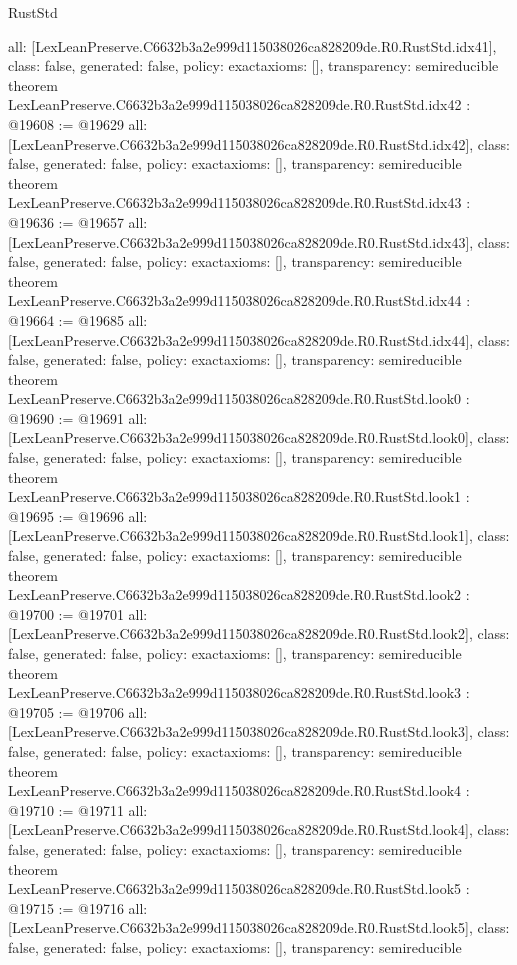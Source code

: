 \begin{lexlean}{RustStd}
\begin{coremodule}
{  all: [LexLeanPreserve.C6632b3a2e999d115038026ca828209de.R0.RustStd.idx41],
  class: false,
  generated: false,
  policy: exact{axioms: []},
  transparency: semireducible
}
theorem LexLeanPreserve.C6632b3a2e999d115038026ca828209de.R0.RustStd.idx42 : @19608 := @19629 {
  all: [LexLeanPreserve.C6632b3a2e999d115038026ca828209de.R0.RustStd.idx42],
  class: false,
  generated: false,
  policy: exact{axioms: []},
  transparency: semireducible
}
theorem LexLeanPreserve.C6632b3a2e999d115038026ca828209de.R0.RustStd.idx43 : @19636 := @19657 {
  all: [LexLeanPreserve.C6632b3a2e999d115038026ca828209de.R0.RustStd.idx43],
  class: false,
  generated: false,
  policy: exact{axioms: []},
  transparency: semireducible
}
theorem LexLeanPreserve.C6632b3a2e999d115038026ca828209de.R0.RustStd.idx44 : @19664 := @19685 {
  all: [LexLeanPreserve.C6632b3a2e999d115038026ca828209de.R0.RustStd.idx44],
  class: false,
  generated: false,
  policy: exact{axioms: []},
  transparency: semireducible
}
theorem LexLeanPreserve.C6632b3a2e999d115038026ca828209de.R0.RustStd.look0 : @19690 := @19691 {
  all: [LexLeanPreserve.C6632b3a2e999d115038026ca828209de.R0.RustStd.look0],
  class: false,
  generated: false,
  policy: exact{axioms: []},
  transparency: semireducible
}
theorem LexLeanPreserve.C6632b3a2e999d115038026ca828209de.R0.RustStd.look1 : @19695 := @19696 {
  all: [LexLeanPreserve.C6632b3a2e999d115038026ca828209de.R0.RustStd.look1],
  class: false,
  generated: false,
  policy: exact{axioms: []},
  transparency: semireducible
}
theorem LexLeanPreserve.C6632b3a2e999d115038026ca828209de.R0.RustStd.look2 : @19700 := @19701 {
  all: [LexLeanPreserve.C6632b3a2e999d115038026ca828209de.R0.RustStd.look2],
  class: false,
  generated: false,
  policy: exact{axioms: []},
  transparency: semireducible
}
theorem LexLeanPreserve.C6632b3a2e999d115038026ca828209de.R0.RustStd.look3 : @19705 := @19706 {
  all: [LexLeanPreserve.C6632b3a2e999d115038026ca828209de.R0.RustStd.look3],
  class: false,
  generated: false,
  policy: exact{axioms: []},
  transparency: semireducible
}
theorem LexLeanPreserve.C6632b3a2e999d115038026ca828209de.R0.RustStd.look4 : @19710 := @19711 {
  all: [LexLeanPreserve.C6632b3a2e999d115038026ca828209de.R0.RustStd.look4],
  class: false,
  generated: false,
  policy: exact{axioms: []},
  transparency: semireducible
}
theorem LexLeanPreserve.C6632b3a2e999d115038026ca828209de.R0.RustStd.look5 : @19715 := @19716 {
  all: [LexLeanPreserve.C6632b3a2e999d115038026ca828209de.R0.RustStd.look5],
  class: false,
  generated: false,
  policy: exact{axioms: []},
  transparency: semireducible
}
\end{coremodule}
\end{lexlean}
